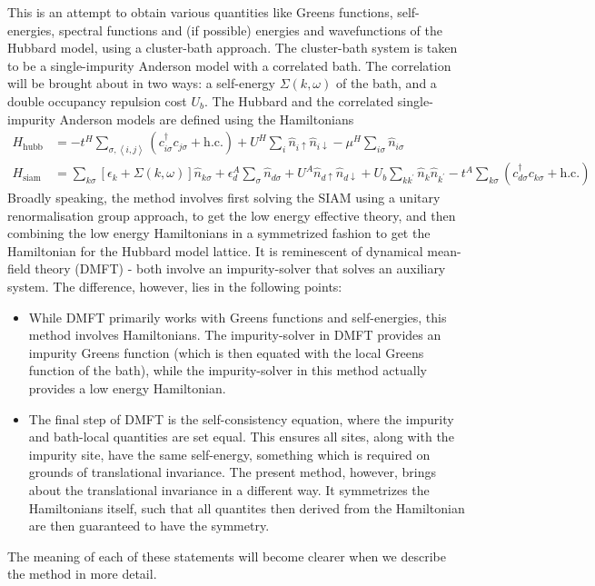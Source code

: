 \documentclass{report}
\numberwithin{equation}{section}
\begin{document}
This is an attempt to obtain various quantities like Greens functions, self-energies, spectral functions and (if possible) energies and wavefunctions of the Hubbard model, using a cluster-bath approach. The cluster-bath system is taken to be a single-impurity Anderson model with a correlated bath. The correlation will be brought about in two ways: a self-energy $\Sigma(k,\omega)$ of the bath, and a double occupancy repulsion cost $U_b$. The Hubbard and the correlated single-impurity Anderson models are defined using the Hamiltonians
\begin{align}
H_\text{hubb} &= -t^H\sum_{\sigma,\left<i,j \right>}\left(c^\dagger_{i\sigma} c_{j\sigma} + \text{h.c.}\right) + U^H\sum_i \hat n_{i \uparrow} \hat n_{i \downarrow} - \mu^H \sum_{i\sigma}\hat n_{i\sigma}\\
H_\text{siam} &= \sum_{k\sigma}\left[\epsilon_k + \Sigma(k,\omega)\right]\hat n_{k\sigma} + \epsilon_d^A \sum_\sigma\hat n_{d\sigma} + U^A \hat n_{d \uparrow} \hat n_{d \downarrow} + U_b \sum_{kk^\prime}\hat n_k \hat n_{k^\prime} -t^A\sum_{k\sigma}\left(c^\dagger_{d\sigma}c_{k\sigma} + \text{h.c.}\right) \label{clus_bath_siam}
\end{align}
Broadly speaking, the method involves first solving the SIAM using a unitary renormalisation group approach, to get the low energy effective theory, and then combining the low energy Hamiltonians in a symmetrized fashion to get the Hamiltonian for the Hubbard model lattice. It is reminescent of dynamical mean-field theory (DMFT) - both involve an impurity-solver that solves an auxiliary system. The difference, however, lies in the following points:
\begin{itemize}
	\item While DMFT primarily works with Greens functions and self-energies, this method involves Hamiltonians. The impurity-solver in DMFT provides an impurity Greens function (which is then equated with the local Greens function of the bath), while the impurity-solver in this method actually provides a low energy Hamiltonian.
	\item The final step of DMFT is the self-consistency equation, where the impurity and bath-local quantities are set equal. This ensures all sites, along with the impurity site, have the same self-energy, something which is required on grounds of  translational invariance. The present method, however, brings about the translational invariance in a different way. It symmetrizes the Hamiltonians itself, such that all quantites then derived from the Hamiltonian are then guaranteed to have the symmetry.
\end{itemize}
The meaning of each of these statements will become clearer when we describe the method in more detail.
\end{document}
